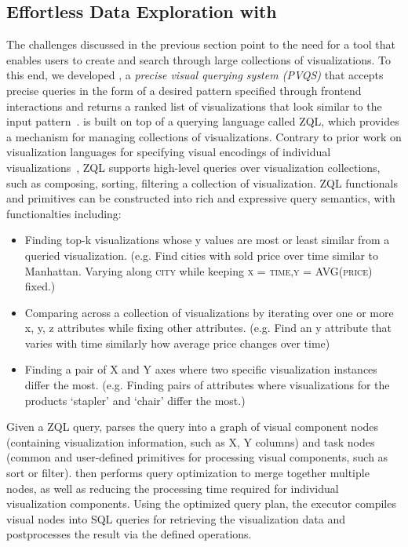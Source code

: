 \subsection{Effortless Data Exploration with \zv}
\par The challenges discussed in the previous section point to the need for a tool that enables users to create and search through large collections of visualizations. To this end, we developed \zv, a \emph{precise visual querying system (PVQS)} that accepts precise queries in the form of a desired pattern specified through frontend interactions and returns a ranked list of visualizations that look similar to the input pattern~\cite{Siddiqui2016}. \zv is built on top of a querying language called ZQL, which provides a mechanism for managing collections of visualizations. Contrary to prior work on visualization languages for specifying visual encodings of individual visualizations~\cite{Stolte2002,Wilkinson2005}, ZQL supports high-level queries over visualization collections, such as composing, sorting, filtering a collection of visualization. ZQL functionals and primitives can be constructed into rich and expressive query semantics, with functionalties including: 
\begin{itemize}
	\item Finding top-k visualizations whose y values are most or least similar from a queried visualization. (e.g. Find cities with sold price over time similar to Manhattan. Varying along \textsc{city} while keeping \textsc{x = time,y = AVG(price)} fixed.) 
	\item Comparing across a collection of visualizations by iterating over one or more x, y, z attributes while fixing other attributes. (e.g. Find an y attribute that varies with time similarly how average price changes over time)
	\item Finding a pair of X and Y axes where two specific visualization instances differ the most. (e.g. Finding pairs of attributes where visualizations for the products `stapler' and `chair' differ the most.)
\end{itemize}
\par Given a ZQL query, \zv parses the query into a graph of visual component nodes (containing visualization information, such as X, Y columns) and task nodes (common and user-defined primitives for processing visual components, such as sort or filter). \zv then performs query optimization to merge together multiple nodes, as well as reducing the processing time required for individual visualization components. Using the optimized query plan, the executor compiles visual nodes into SQL queries for retrieving the visualization data and postprocesses the result via the defined operations. 

